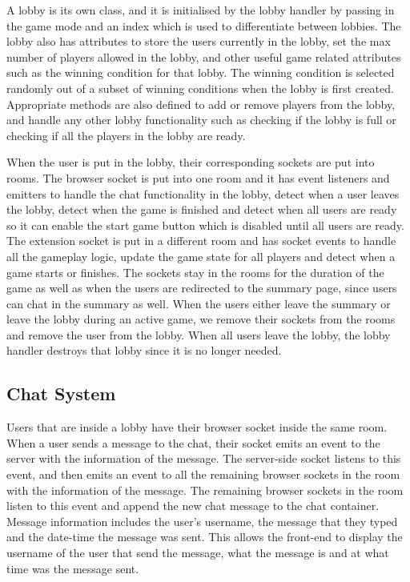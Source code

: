 \documentclass{l4proj}
\begin{document}
A lobby is its own class, and it is initialised by the lobby handler by passing in the game mode and an index which is used to differentiate between lobbies. The lobby also has attributes to store the users currently in the lobby, set the max number of players allowed in the lobby, and other useful game related attributes such as the winning condition for that lobby. The winning condition is selected randomly out of a subset of winning conditions when the lobby is first created. Appropriate methods are also defined to add or remove players from the lobby, and handle any other lobby functionality such as checking if the lobby is full or checking if all the players in the lobby are ready.

When the user is put in the lobby, their corresponding sockets are put into rooms. The browser socket is put into one room and it has event listeners and emitters to handle the chat functionality in the lobby, detect when a user leaves the lobby, detect when the game is finished and detect when all users are ready so it can enable the start game button which is disabled until all users are ready. The extension socket is put in a different room and has socket events to handle all the gameplay logic, update the game state for all players and detect when a game starts or finishes. The sockets stay in the rooms for the duration of the game as well as when the users are redirected to the summary page, since users can chat in the summary as well. When the users either leave the summary or leave the lobby during an active game, we remove their sockets from the rooms and remove the user from the lobby. When all users leave the lobby, the lobby handler destroys that lobby since it is no longer needed.

\subsection{Chat System}
Users that are inside a lobby have their browser socket inside the same room. When a user sends a message to the chat, their socket emits an event to the server with the information of the message. The server-side socket listens to this event, and then emits an event to all the remaining browser sockets in the room with the information of the message. The remaining browser sockets in the room listen to this event and append the new chat message to the chat container. Message information includes the user's username, the message that they typed and the date-time the message was sent. This allows the front-end to display the username of the user that send the message, what the message is and at what time was the message sent.
\end{document}
